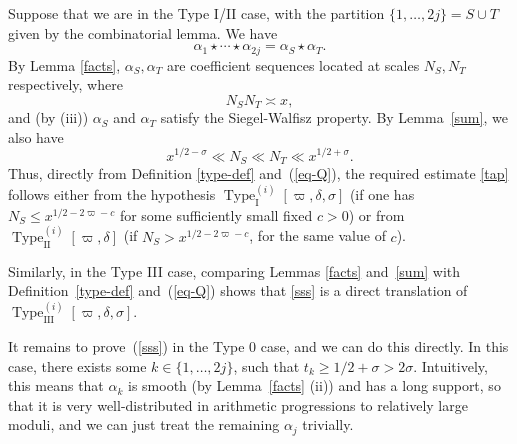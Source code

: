 \documentclass[12pt,a4paper,reqno]{amsart}
\numberwithin{equation}{section}
\theoremstyle{plain}
\theoremstyle{definition}
\newcommand\TypeI{\operatorname{Type}_{\operatorname{I}}}
\newcommand\TypeII{\operatorname{Type}_{\operatorname{II}}}
\newcommand\TypeIII{\operatorname{Type}_{\operatorname{III}}}
\renewcommand{\sim}{\asymp}
\begin{document}
Suppose that we are in the Type I/II case, with the partition
$\{1,\ldots, 2j\}=S\cup T$ given by the combinatorial lemma. We have
$$
\alpha_1\star\cdots\star \alpha_{2j}=\alpha_S\star \alpha_T.
$$
By Lemma \ref{facts}, $\alpha_S, \alpha_T$ are coefficient
sequences located at scales $N_S, N_T$ respectively, where
$$ 
N_S N_T \sim x,
$$ 
and (by (iii)) $\alpha_S$ and $\alpha_T$ satisfy the Siegel-Walfisz
property.  By Lemma~\ref{sum}, we also have
$$ 
x^{1/2-\sigma} \ll N_S \ll N_T \ll x^{1/2+\sigma}.
$$
Thus, directly from Definition \ref{type-def} and~(\ref{eq-Q}),
the required estimate \eqref{tap} follows either from the hypothesis
$\TypeI^{(i)}[\varpi,\delta,\sigma]$ (if one has $N_S \leq
x^{1/2-2\varpi-c}$ for some sufficiently small fixed $c>0$) or from
$\TypeII^{(i)}[\varpi,\delta]$ (if $N_S > x^{1/2-2\varpi-c}$, for the
same value of $c$).

Similarly, in the Type III case, comparing Lemmas \ref{facts}
and~\ref{sum} with Definition~\ref{type-def} and~(\ref{eq-Q}) shows
that \eqref{sss} is a direct translation of
$\TypeIII^{(i)}[\varpi,\delta,\sigma]$.

It remains to prove~(\ref{sss}) in the Type 0 case, and we can do this
directly.  In this case, there exists some $k \in \{ 1, \ldots, 2j \}$, such
that $t_k\geq 1/2+\sigma>2\sigma$. Intuitively, this means that
$\alpha_k$ is smooth (by Lemma~\ref{facts} (ii)) and has a long
support, so that it is very well-distributed in arithmetic
progressions to relatively large moduli, and we can just treat the
remaining $\alpha_j$ trivially.
\end{document}
